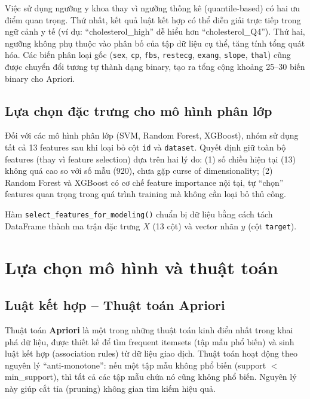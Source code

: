 Việc sử dụng ngưỡng y khoa thay vì ngưỡng thống kê (quantile-based) có hai ưu điểm quan trọng. Thứ nhất, kết quả luật kết hợp có thể diễn giải trực tiếp trong ngữ cảnh y tế (ví dụ: ``cholesterol\_high'' dễ hiểu hơn ``cholesterol\_Q4''). Thứ hai, ngưỡng không phụ thuộc vào phân bố của tập dữ liệu cụ thể, tăng tính tổng quát hóa. Các biến phân loại gốc (\texttt{sex}, \texttt{cp}, \texttt{fbs}, \texttt{restecg}, \texttt{exang}, \texttt{slope}, \texttt{thal}) cũng được chuyển đổi tương tự thành dạng binary, tạo ra tổng cộng khoảng 25--30 biến binary cho Apriori.

\subsection{Lựa chọn đặc trưng cho mô hình phân lớp}

Đối với các mô hình phân lớp (SVM, Random Forest, XGBoost), nhóm sử dụng tất cả 13 features sau khi loại bỏ cột \texttt{id} và \texttt{dataset}. Quyết định giữ toàn bộ features (thay vì feature selection) dựa trên hai lý do: (1) số chiều hiện tại (13) không quá cao so với số mẫu (920), chưa gặp curse of dimensionality; (2) Random Forest và XGBoost có cơ chế feature importance nội tại, tự ``chọn'' features quan trọng trong quá trình training mà không cần loại bỏ thủ công.

Hàm \texttt{select\_features\_for\_modeling()} chuẩn bị dữ liệu bằng cách tách DataFrame thành ma trận đặc trưng $X$ (13 cột) và vector nhãn $y$ (cột \texttt{target}).

\section{Lựa chọn mô hình và thuật toán}

\subsection{Luật kết hợp -- Thuật toán Apriori}

Thuật toán \textbf{Apriori} \cite{agrawal1994fast} là một trong những thuật toán kinh điển nhất trong khai phá dữ liệu, được thiết kế để tìm frequent itemsets (tập mẫu phổ biến) và sinh luật kết hợp (association rules) từ dữ liệu giao dịch. Thuật toán hoạt động theo nguyên lý ``anti-monotone'': nếu một tập mẫu không phổ biến (support $<$ min\_support), thì tất cả các tập mẫu chứa nó cũng không phổ biến. Nguyên lý này giúp cắt tỉa (pruning) không gian tìm kiếm hiệu quả.

